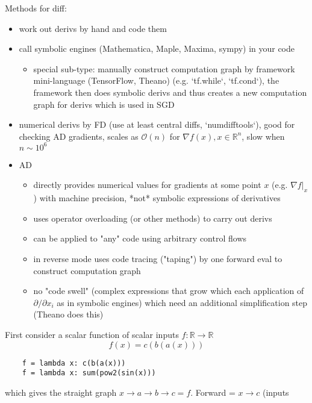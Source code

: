 \documentclass[paper=a4,11pt,headsepline]{scrartcl}
\newcommand{\ve}[1]{\ensuremath{\bm{\mathit{#1}}}}
\newcommand{\ra}{\rightarrow}
\begin{document}
Methods for diff:

\begin{itemize}
    \item work out derivs by hand and code them
    \item call symbolic engines (Mathematica, Maple, Maxima, sympy) in your code
    \begin{itemize}
        \item special sub-type: manually construct computation graph by
            framework mini-language (TensorFlow, Theano) (e.g. `tf.while`,
            `tf.cond`), the framework then does symbolic derivs and thus
            creates a new computation graph for derivs which is used in SGD
    \end{itemize}
\item numerical derivs by FD (use at least central diffs, `numdifftools`), good
    for checking AD gradients, scales as $\mathcal O(n)$ for $\nabla f(\ve x),
    \ve x\in\mathbb R^n$, slow when $n\sim 10^6$
\item AD
    \begin{itemize}
        \item directly provides numerical values for gradients at some point
            $\ve x$ (e.g. $\nabla f|_{\ve x}$) with machine precision, *not*
            symbolic expressions of derivatives
        \item uses operator overloading (or other methods) to carry out derivs
        \item can be applied to "any" code using arbitrary control flows
        \item in reverse mode uses code tracing ("taping") by one forward eval
            to construct computation graph
        \item no "code swell" (complex expressions that grow which each
            application of $\partial/\partial x_i$ as in symbolic engines)
            which need an additional simplification step (Theano does this)
    \end{itemize}
\end{itemize}
%
First consider a scalar function of scalar inputs $f:\mathbb R\ra\mathbb R$
\begin{equation}
    f(x) = c(b(a(x)))
\end{equation}
\begin{verbatim}
    f = lambda x: c(b(a(x)))
    f = lambda x: sum(pow2(sin(x)))
\end{verbatim}
which gives the straight graph $x\ra a\ra b\ra c = f$. Forward = $x \ra c$ (inputs
\end{document}
